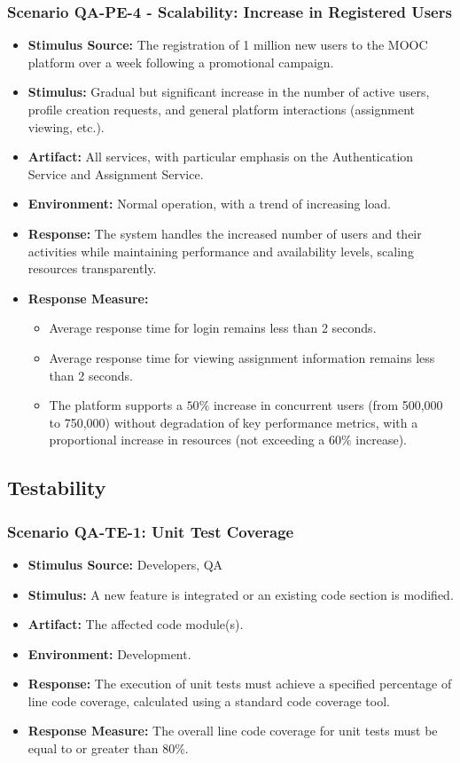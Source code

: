 \subsubsection{Scenario QA-PE-4 - Scalability: Increase in Registered Users}
\begin{itemize}
    \item \textbf{Stimulus Source:} The registration of 1 million new users to the MOOC platform over a week following a promotional campaign.
    \item \textbf{Stimulus:} Gradual but significant increase in the number of active users, profile creation requests, and general platform interactions (assignment viewing, etc.).
    \item \textbf{Artifact:} All services, with particular emphasis on the Authentication Service and Assignment Service.
    \item \textbf{Environment:} Normal operation, with a trend of increasing load.
    \item \textbf{Response:} The system handles the increased number of users and their activities while maintaining performance and availability levels, scaling resources transparently.
    \item \textbf{Response Measure:}
    \begin{itemize}
        \item Average response time for login remains less than 2 seconds.
        \item Average response time for viewing assignment information remains less than 2 seconds.
        \item The platform supports a $50\%$ increase in concurrent users (from 500,000 to 750,000) without degradation of key performance metrics, with a proportional increase in resources (not exceeding a $60\%$ increase).
    \end{itemize}
\end{itemize}

\subsection{Testability}

\subsubsection{Scenario QA-TE-1: Unit Test Coverage}
\begin{itemize}
    \item \textbf{Stimulus Source:} Developers, QA
    \item \textbf{Stimulus:} A new feature is integrated or an existing code section is modified.
    \item \textbf{Artifact:} The affected code module(s).
    \item \textbf{Environment:} Development.
    \item \textbf{Response:} The execution of unit tests must achieve a specified percentage of line code coverage, calculated using a standard code coverage tool.
    \item \textbf{Response Measure:} The overall line code coverage for unit tests must be equal to or greater than 80\%.
\end{itemize}
